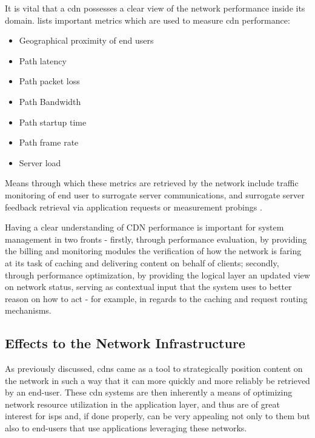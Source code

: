     It is vital that a \gls{cdn} possesses a clear view of the network performance inside its domain.
    \cite{cdn-survey} lists important metrics which are used to measure \gls{cdn} performance:

    \begin{itemize}
        \item Geographical proximity of end users
        \item Path latency
        \item Path packet loss
        \item Path Bandwidth
        \item Path startup time
        \item Path frame rate
        \item Server load
    \end{itemize}

    Means through which these metrics are retrieved by the network include traffic monitoring of end user to surrogate server communications, and surrogate server feedback retrieval via application requests or measurement probings \cite{cdn-survey} \cite{akamai-report}.

    Having a clear understanding of CDN performance is important for system management in two fronts - firstly, through performance evaluation, by providing the billing and monitoring modules the verification of how the network is faring at its task of caching and delivering content on behalf of clients; secondly, through performance optimization, by providing the logical layer an updated view on network status, serving as contextual input that the system uses to better reason on how to act - for example, in regards to the caching and request routing mechanisms.

\subsection{Effects to the Network Infrastructure}

    As previously discussed, \glspl{cdn} came as a tool to strategically position content on the network in such a way that it can more quickly and more reliably be retrieved by an end-user.
    These \gls{cdn} systems are then inherently a means of optimizing network resource utilization in the application layer, and thus are of great interest for \glspl{isp} and, if done properly, can be very appealing not only to them but also to end-users that use applications leveraging these networks.

